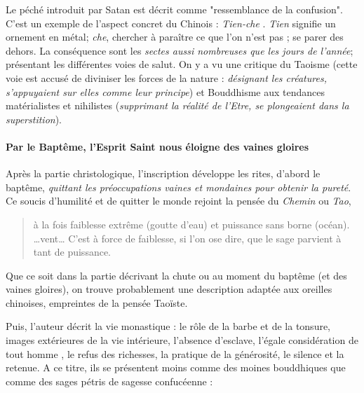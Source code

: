  
 Le péché introduit par Satan est décrit comme "ressemblance de la confusion". C'est un exemple de l'aspect concret du Chinois :\textit{ Tien-che }. \textit{Tien} signifie un ornement en métal; \textit{che}, chercher à paraître ce que l'on n'est pas ; se parer des dehors. La conséquence sont les \textit{sectes aussi nombreuses que les jours de l'année}; présentant les différentes voies de salut. On y a vu une critique du Taoisme (cette voie est accusé de diviniser les forces de la nature :  \textit{désignant les créatures, s'appuyaient sur elles comme leur principe}) et Bouddhisme aux tendances matérialistes et nihilistes (\textit{supprimant la réalité de l'Etre, se plongeaient dans la superstition}).  
 
 
 
 \paragraph{Par le Baptême, l'Esprit Saint nous éloigne des vaines gloires} Après la partie christologique, l'inscription développe les rites, d'abord le baptême, \textit{quittant les préoccupations vaines et mondaines pour obtenir la pureté}. Ce soucis d'humilité et de quitter le monde  rejoint la pensée du \textit{Chemin} ou \textit{Tao},  
 
 \begin{quote}
     à la fois faiblesse extrême (goutte d’eau) et puissance sans borne (océan). \ldots vent… C’est à force de faiblesse, si l’on ose dire, que le sage parvient à tant de puissance. 
\cite[p. 130 ]{PolDroit:voyage} 
 \end{quote}

Que ce soit dans la partie décrivant la chute ou au moment du baptême (et des vaines gloires), on trouve probablement une description adaptée aux oreilles chinoises, empreintes de la pensée Taoïste.

 Puis, l'auteur décrit la vie monastique : le rôle de la barbe et de la tonsure, images extérieures de la vie intérieure, l'absence d'esclave, l'égale considération de tout homme , le refus des richesses, la pratique de la générosité, le silence et la retenue. A ce titre, ils se présentent moins comme des moines bouddhiques que comme des sages pétris de sagesse confucéenne : 
 
